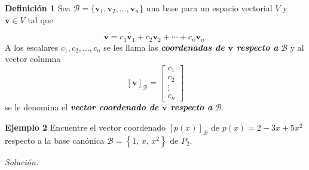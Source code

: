 {\nologo
\begin{frame}%
	
	\begin{defi}{\textbf{Definición 1}}
		Sea $\mathcal{B}=\{\mathbf{v}_1, \mathbf{v}_2, \hdots , \mathbf{v}_n \}$ una base para un espacio \hspace{-1mm} vectorial $V$ y 
		$\mathbf{v}\in V$ \hspace{-1mm} tal que
		
		\vspace{-5mm}
		\[
		\mathbf{v} = c_1 \mathbf{v}_1 + c_2\mathbf{v}_2 + \cdots + c_n\mathbf{v}_n.
		\]
		A los escalares $c_1, c_2,\hdots,c_n$
		se les llama las \textbf{\textit{coordenadas de $\mathbf{v}$ respecto a}} $\mathcal{B}$ y al vector columna
		\[
		\left[ \mathbf{v} \right]_{\mathcal{B}} = 
		\left[
		\begin{array}{c}
		c_1\\
		c_2\\
		\vdots\\
		c_n
		\end{array}
		\right]
		\]
		se le denomina el \textbf{\textit{vector coordenado de $\mathbf{v}$ respecto a}} $\mathcal{B}$.
	\end{defi}	
	
	\vspace{0mm}
	
	\begin{ej}{\textbf{Ejemplo 2}}
		Encuentre el vector coordenado $\left[ p(x) \right]_{\mathcal{B}}$ de $p(x)=2-3x+5x^2$ respecto a
		la base canónica $\mathcal{B} = \left\{1,\,x,\,x^2 \right\}$ de $P_2$.
	\end{ej}
	\textit{Solución.}
	
\end{frame}
}


\subsection{}

